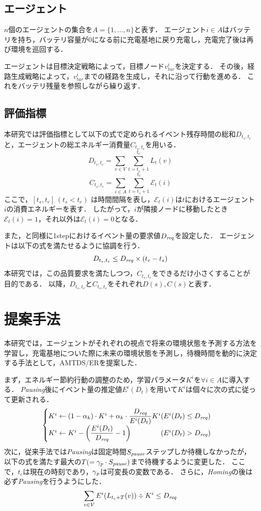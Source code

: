 \documentclass[11pt,a4j,twocolumn]{jarticle}
\def\AgentSet{A}
\def\Dreq{{D_{\it req}}}
\def\En{\mathcal{E}}
\def\PausingInt{{S_{\it pause}}}
\def\PauseTimeFactor{{\gamma_{\it p}}}
\begin{document}
\subsection{エージェント}
$n$個のエージェントの集合を$\AgentSet=\{1,\dots ,n\}$と表す．
エージェント$i\in\AgentSet$はバッテリを持ち，バッテリ容量が0になる前に充電基地に戻り充電し，充電完了後は再び環境を巡回する．
\par

エージェントは目標決定戦略によって，目標ノード$v^i_{tar}$を決定する．
その後，経路生成戦略によって，$v^i_{tar}$までの経路を生成し，それに沿って行動を進める．
これをバッテリ残量を参照しながら繰り返す．

\subsection{評価指標}
本研究では評価指標として以下の式で定められるイベント残存時間の総和$D_{t_s,t_e}$と，エージェントの総エネルギー消費量$C_{t_s,t_e}$を用いる．
%
\[
  D_{t_s,t_e} = \sum_{v \in V} \sum^{t_e}_{t=t_s+1} L_t(v)
\]
%
\[
  C_{t_s,t_e} = \sum_{i \in \AgentSet} \sum^{t_e}_{t=t_s+1} \En_t(i)
\]
%
ここで，$[t_s,t_e]~(t_s < t_e)$ は時間間隔を表し，$\En_t(i)$は$t$におけるエージェント$i$の消費エネルギーを表す．
したがって，$i$が隣接ノードに移動したとき$\En_t(i)=1$，それ以外は$\En_t(i)=0$となる．
\par
また，\cite{Wu2019}と同様に1stepにおけるイベント量の要求値$\Dreq$を設定した．
エージェントは以下の式を満たせるように協調を行う．
%
\[
  D_{t_s,t_e}\leq \Dreq \times (t_e - t_s)
\]
%
本研究では，この品質要求を満たしつつ，$C_{t_s, t_e}$をできるだけ小さくすることが目的である．
以降，$D_{t_s,t_e}$と$C_{t_s,t_e}$をそれぞれ$D(s), C(s)$と表す．


\section{提案手法}
本研究では，エージェントがそれぞれの視点で将来の環境状態を予測する方法を学習し，充電基地についた際に未来の環境状態を予測し，待機時間を動的に決定する手法として，AMTDS/ERを提案した．
\par

まず，エネルギー節約行動の調整のため，学習パラメータ$K^i$を$\forall i\in \AgentSet$に導入する．
{\em Pausing}後にイベント量の推定値$E^i(D_t)$を用いて$K^i$は個々に次の式に従って更新される．
%
\[
  \begin{cases}
    K^i \gets (1 - \alpha_k) \cdot K^i + \alpha_k \cdot \dfrac{\Dreq}{E^i(D_t)}K^i 
    \hfill (E^i(D_t) \leq \Dreq)\\
    K^i \gets K^i - \left( \dfrac{E^i(D_t)}{\Dreq} - 1 \right) 
    \hfill (E^i(D_t) > \Dreq)
  \end{cases}
\]
%
次に，従来手法では{\em Pausing}は固定時間$\PausingInt$ステップしか待機しなかったが，以下の式を満たす最大の$T (= \PauseTimeFactor\cdot\PausingInt)$まで待機するように変更した．
ここで，$t_c$は現在の時刻であり，$\PauseTimeFactor$は可変長の変数である．
さらに，{\em Homing}の後は必ず{\em Pausing}を行うようにした．
% 
\[
 \sum_{v \in V} E^i(L_{t_c+T}(v)) \div K^i \leq \Dreq
\] 
%
\end{document}

